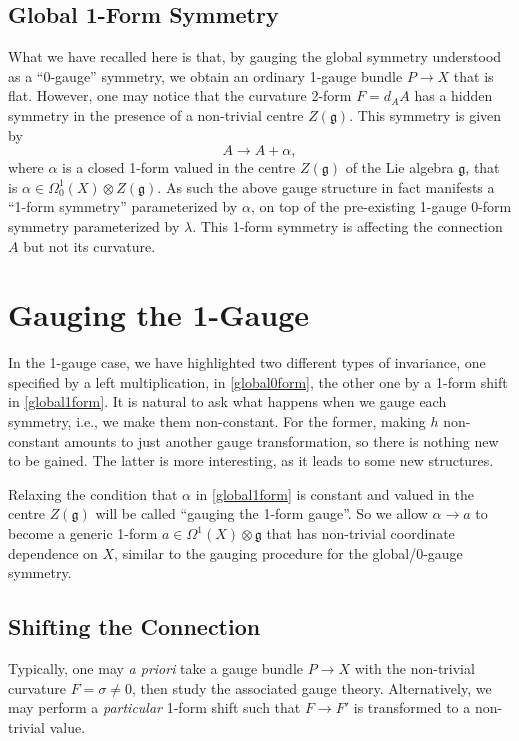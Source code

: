 \documentclass[onecolumn]{article}
\theoremstyle{theorem}
\theoremstyle{remark}
\theoremstyle{example}
\theoremstyle{definition}
\numberwithin{equation}{section}
\def\g{\mathfrak g}
\begin{document}
\subsection{Global 1-Form Symmetry} 
What we have recalled here is that, by gauging the global symmetry understood as a ``0-gauge'' symmetry, we obtain an ordinary 1-gauge bundle $P\rightarrow X$ that is flat. However, one may notice that the curvature 2-form $F=d_AA$ has a hidden symmetry in the presence of a non-trivial centre $Z(\mathfrak{g})$. This symmetry is  given by
\begin{equation}
    A\rightarrow A+\alpha,\label{global1form}
\end{equation}
where $\alpha$ is a closed 1-form valued in the centre  $Z(\mathfrak{g})$ 
of the Lie algebra $\g$, that is $\alpha\in \Omega^1_0(X)\otimes Z(\mathfrak{g})$. As such the above gauge structure in fact manifests a ``1-form  symmetry'' parameterized by $\alpha$, on top of the pre-existing 1-gauge 0-form symmetry parameterized by $\lambda$. This  1-form symmetry is affecting the connection $A$ but not its curvature.  


\section{Gauging the 1-Gauge}\label{sec:gau1gau}
In the 1-gauge case, we have highlighted two different types of invariance, one specified by a left multiplication, in \eqref{global0form}, the other one by a 1-form shift in \eqref{global1form}. It is natural to ask what happens when we gauge each symmetry, i.e., we make them non-constant. For the former, making $h$ non-constant amounts to just another gauge transformation, so there is nothing new to be gained. The latter is more interesting, as it leads to some new structures.   

Relaxing the condition that $\alpha$ in  \eqref{global1form} is constant and valued in the centre $Z(\mathfrak{g})$ will be called ``gauging the 1-form gauge''. So we allow $\alpha\rightarrow a$ to become a generic 1-form $a\in\Omega^1(X)\otimes\mathfrak{g}$ that has non-trivial coordinate dependence on $X$, similar to the gauging procedure for the global/0-gauge symmetry.

\subsection{Shifting the Connection}
Typically, one may \textit{{a priori}} take a gauge bundle $P\rightarrow X$ with the non-trivial curvature $F=\sigma\neq 0$, then study the associated gauge theory. Alternatively, we may perform a {\it {particular}} 1-form shift such that $F \rightarrow F'$ is transformed to a non-trivial value. 
\end{document}
